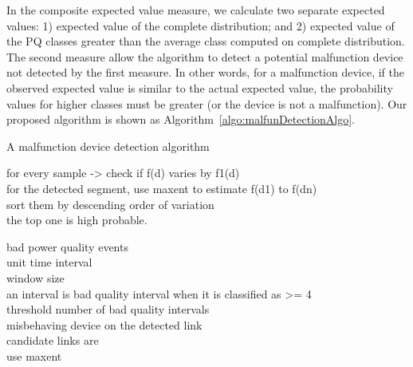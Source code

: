 \documentclass[12pt,oneside]{book}
\begin{document}
In the composite expected value measure, we calculate two separate expected values: 1) expected value of the complete distribution; and 2) expected value of the PQ classes greater than the average class computed on complete distribution. The second measure allow the algorithm to detect a potential malfunction device not detected by the first measure. In other words, for a malfunction device, if the observed expected value is similar to the actual expected value, the probability values for higher classes must be greater (or the device is not a malfunction). Our proposed algorithm is shown as Algorithm~\ref{algo:malfunDetectionAlgo}.

\begin{algorithm}[!t]
\begin{small}
\caption{A malfunction device detection algorithm} \label{algo:malfunDetectionAlgo}
\end{small}
\end{algorithm}

for every sample -> check if f(d) varies by f1(d)\\
for the detected segment, use maxent to estimate f(d1) to f(dn)\\
sort them by descending order of variation\\
the top one is high probable.

bad power quality events\\
unit time interval\\
window size\\
an interval is bad quality interval when it is classified as >= 4\\
threshold number of bad quality intervals\\
misbehaving device on the detected link\\
candidate links are\\
use maxent
\end{document}
